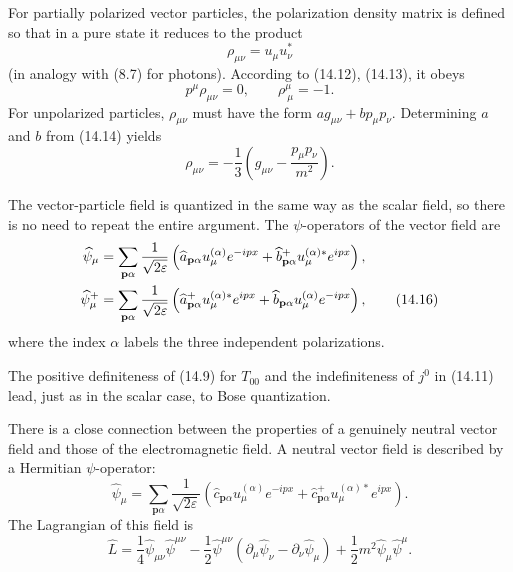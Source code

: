 For partially polarized vector particles, the polarization density matrix is defined so that in a pure state it reduces to the product
\[
\rho_{\mu\nu}=u_\mu u^*_\nu
\]
(in analogy with (8.7) for photons). According to (14.12), (14.13), it obeys
\begin{equation}
p^\mu\rho_{\mu\nu}=0,
\qquad
\rho^\mu_{\ \mu}=-1.
\tag{14.14}
\end{equation}
For unpolarized particles, $\rho_{\mu\nu}$ must have the form $ag_{\mu\nu}+bp_\mu p_\nu$. Determining $a$ and $b$ from (14.14) yields
\begin{equation}
\rho_{\mu\nu}=-\frac13\left(g_{\mu\nu}-\frac{p_\mu p_\nu}{m^2}\right).
\tag{14.15}
\end{equation}

The vector-particle field is quantized in the same way as the scalar field, so there is no need to repeat the entire argument. The $\psi$-operators of the vector field are
\begin{align}
\widehat\psi_\mu
&=\sum_{\mathbf p\alpha}\frac{1}{\sqrt{2\varepsilon}}
\left(\widehat a_{\mathbf p\alpha}u_\mu^{(\alpha)}e^{-ipx}
+\widehat b^+_{\mathbf p\alpha}u_\mu^{(\alpha)*}e^{ipx}\right),
\notag\\
\widehat\psi^+_\mu
&=\sum_{\mathbf p\alpha}\frac{1}{\sqrt{2\varepsilon}}
\left(\widehat a^+_{\mathbf p\alpha}u_\mu^{(\alpha)*}e^{ipx}
+\widehat b_{\mathbf p\alpha}u_\mu^{(\alpha)}e^{-ipx}\right),
\tag{14.16}
\end{align}
where the index $\alpha$ labels the three independent polarizations.

The positive definiteness of (14.9) for $T_{00}$ and the indefiniteness of $j^0$ in (14.11) lead, just as in the scalar case, to Bose quantization.

There is a close connection between the properties of a genuinely neutral vector field and those of the electromagnetic field. A neutral vector field is described by a Hermitian $\psi$-operator:
\begin{equation}
\widehat\psi_\mu
=\sum_{\mathbf p\alpha}\frac{1}{\sqrt{2\varepsilon}}
\left(\widehat c_{\mathbf p\alpha}u_\mu^{(\alpha)}e^{-ipx}
+\widehat c^+_{\mathbf p\alpha}u_\mu^{(\alpha)*}e^{ipx}\right).
\tag{14.17}
\end{equation}
The Lagrangian of this field is
\begin{equation}
\widehat L
=\frac14\widehat\psi_{\mu\nu}\widehat\psi^{\mu\nu}
-\frac12\widehat\psi^{\mu\nu}
(\partial_\mu\widehat\psi_\nu-\partial_\nu\widehat\psi_\mu)
+\frac12m^2\widehat\psi_\mu\widehat\psi^\mu.
\tag{14.18}
\end{equation}

